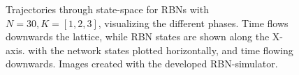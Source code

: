 \begin{figure}

  \caption{
    Trajectories through state-space for RBNs with $N=30, K=[1,2,3]$, visualizing the different phases.
    Time flows downwards the lattice, while RBN states are shown along the X-axis.
    with the network states plotted horizontally, and time flowing downwards.
    Images created with the developed RBN-simulator.
  }
  \label{figure:rbn-phases}
\end{figure}

